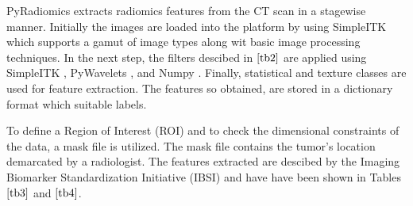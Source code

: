 \documentclass[final,1p,times,twocolumn]{elsarticle}
\begin{document}
PyRadiomics extracts radiomics features from the CT scan in a stagewise manner. Initially the images are loaded into the platform by using SimpleITK which supports a gamut of image types along wit basic image processing techniques. In the next step, the filters descibed in $\ref{tb2}$ are applied using SimpleITK \cite{15}, PyWavelets \cite{16}, and Numpy \cite{17}. Finally, statistical and texture classes are used for feature extraction. The features so obtained, are stored in a dictionary format which suitable labels. 

To define a Region of Interest (ROI) and to check the dimensional constraints of the data, a mask file is utilized. The mask file contains the tumor's location demarcated by a radiologist. The features extracted are descibed by the Imaging Biomarker Standardization Initiative (IBSI) \cite{18} and have have been shown in Tables $\ref{tb3}$ and $\ref{tb4}$.

\end{document}

